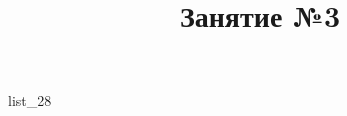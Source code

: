 \documentclass[12pt, a4paper]{article}
\begin{document}
	\title{Занятие №3}
	{list_28}
\end{document}
